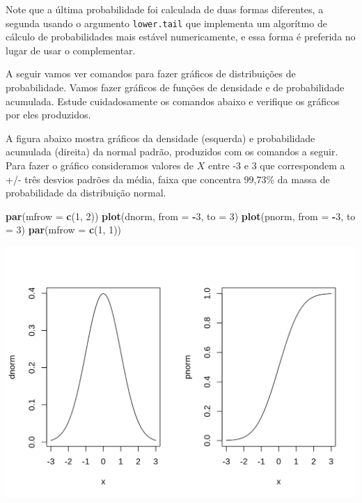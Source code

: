 \documentclass[10pt,a4paper]{book}
\newenvironment{Shaded}{\begin{snugshade}}{\end{snugshade}}
\newcommand{\KeywordTok}[1]{\textcolor[rgb]{0.13,0.29,0.53}{\textbf{#1}}}
\newcommand{\DataTypeTok}[1]{\textcolor[rgb]{0.13,0.29,0.53}{#1}}
\newcommand{\DecValTok}[1]{\textcolor[rgb]{0.00,0.00,0.81}{#1}}
\newcommand{\OperatorTok}[1]{\textcolor[rgb]{0.81,0.36,0.00}{\textbf{#1}}}
\newcommand{\NormalTok}[1]{#1}
\begin{document}
Note que a última probabilidade foi calculada de duas formas diferentes,
a segunda usando o argumento \texttt{lower.tail} que implementa um
algorítmo de cálculo de probabilidades mais estável numericamente, e
essa forma é preferida no lugar de usar o complementar.

A seguir vamos ver comandos para fazer gráficos de distribuições de
probabilidade. Vamos fazer gráficos de funções de densidade e de
probabilidade acumulada. Estude cuidadosamente os comandos abaixo e
verifique os gráficos por eles produzidos.

A figura abaixo mostra gráficos da densidade (esquerda) e probabilidade
acumulada (direita) da normal padrão, produzidos com os comandos a
seguir. Para fazer o gráfico consideramos valores de \(X\) entre -3 e 3
que correspondem a +/- três desvios padrões da média, faixa que
concentra 99,73\% da massa de probabilidade da distribuição normal.

\begin{Shaded}
\begin{Highlighting}[]
\KeywordTok{par}\NormalTok{(}\DataTypeTok{mfrow =} \KeywordTok{c}\NormalTok{(}\DecValTok{1}\NormalTok{, }\DecValTok{2}\NormalTok{))}
\KeywordTok{plot}\NormalTok{(dnorm, }\DataTypeTok{from =} \OperatorTok{-}\DecValTok{3}\NormalTok{, }\DataTypeTok{to =} \DecValTok{3}\NormalTok{)}
\KeywordTok{plot}\NormalTok{(pnorm, }\DataTypeTok{from =} \OperatorTok{-}\DecValTok{3}\NormalTok{, }\DataTypeTok{to =} \DecValTok{3}\NormalTok{)}
\KeywordTok{par}\NormalTok{(}\DataTypeTok{mfrow =} \KeywordTok{c}\NormalTok{(}\DecValTok{1}\NormalTok{, }\DecValTok{1}\NormalTok{))}
\end{Highlighting}
\end{Shaded}

\begin{center}\includegraphics{figures/unnamed-chunk-341-1} \end{center}
\end{document}
